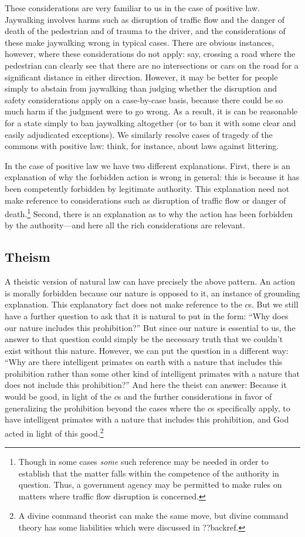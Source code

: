 These considerations are very familiar to us in the case of positive law. Jaywalking involves harms such as
disruption of traffic flow and the danger of death of the pedestrian and of trauma to the driver, and the
considerations of these make jaywalking wrong in typical cases. There are 
obvious instances, however, where these considerations do not apply: say, crossing a road where the pedestrian
can clearly see that there are no intersections or cars on the road for a significant distance in either 
direction. However, it may be better for people simply to abstain from jaywalking than judging whether the 
disruption and safety considerations apply on a case-by-case basis, because there could be so much harm if 
the judgment were to go wrong. As a result, it is can be reasonable for a state simply to ban jaywalking
altogether (or to ban it with some clear and easily adjudicated exceptions). We similarly resolve cases of
tragedy of the commons with positive law: think, for instance, about laws against littering.

In the case of positive law we have two different explanations. First, there is an explanation of why
the forbidden action is wrong in general: this is because it has been competently forbidden by legitimate authority.
This explanation need not make reference to considerations such as disruption of traffic flow or danger
of death.\footnote{Though in some cases \textit{some} such reference may be needed in order to establish
that the matter falls within the competence of the authority in question. Thus, a government agency may
be permitted to make rules on matters where traffic flow disruption is concerned.} Second, there is an 
explanation as to why the action has been forbidden by the authority---and here all the rich considerations
are relevant.

\subsection{Theism}
A theistic version of natural law can have precisely the above pattern. An action is morally forbidden because
our nature is opposed to it, an instance of grounding explanation. This explanatory fact does not make reference 
to the $c$s. But we still have a further question to ask that it is natural to put in the form: ``Why does our nature 
includes this prohibition?'' But since our nature is essential to us, the answer to that question could 
simply be the necessary truth that we couldn't exist without this nature. However, we can put the question
in a different way: ``Why are there intelligent primates on earth with a nature that includes this prohibition
rather than some other kind of intelligent primates with a nature that does not include this prohibition?''
And here the theist can answer: Because it would be good, in light of the $c$s and the
further considerations in favor of generalizing the prohibition beyond the cases where the $c$s specifically
apply, to have intelligent primates with a nature that includes this prohibition, and God acted in light
of this good.\footnote{A divine command theorist can make the same move, but divine command theory has some
liabilities which were discussed in ??backref.}

